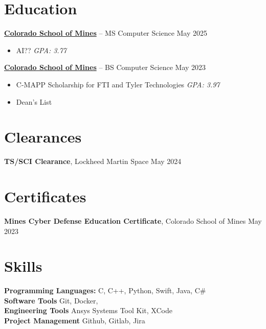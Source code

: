 \documentclass[11pt]{article}       %
\begin{document}
\vspace{-18.5pt}

\section*{Education}
\textbf{\href{https://cs.mines.edu}{Colorado School of Mines}} -- MS Computer Science \hfill May 2025 \\
\vspace{-13.5pt}
\begin{itemize}
  \itemsep -0.5em
  \item AI??  \hfill \textit{GPA: 3.77}
\end{itemize}

\textbf{\href{https://cs.mines.edu}{Colorado School of Mines}} -- BS Computer Science \hfill May 2023 \\
\vspace{-13.5pt}
\begin{itemize}
  \itemsep -0.5em
  \item C-MAPP Scholarship for FTI and Tyler Technologies \hfill \textit{GPA: 3.97}
  \item Dean's List \hfill
\end{itemize}

\vspace{-18.5pt}

\section*{Clearances}
\textbf{TS/SCI Clearance}, {Lockheed Martin Space} \hfill May 2024 \\

\section*{Certificates}
\textbf{Mines Cyber Defense Education Certificate}, {Colorado School of Mines} \hfill May 2023 \\

\vspace{-6.5pt}

\section*{Skills}
\textbf{Programming Languages:} C, C++, Python, Swift, Java, C\# \\
\textbf{Software Tools} Git, Docker, \\
\textbf{Engineering Tools} Ansys Systems Tool Kit, XCode \\
\textbf{Project Management} Github, Gitlab, Jira \\
\end{document}
